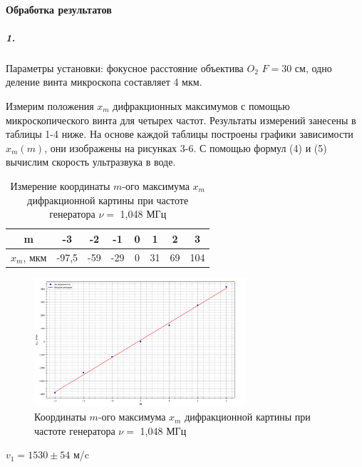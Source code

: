 \documentclass[a4paper,12pt]{article}
\begin{document}
\paragraph{Обработка результатов\\}
\subparagraph{1.} Параметры установки: фокусное расстояние объектива $  O_2  $ $ F = 30 $ см, одно деление винта микроскопа составляет 4 мкм.\par
Измерим положения $ x_m $ дифракционных максимумов с помощью микроскопического винта для четырех частот. Результаты измерений занесены в таблицы 1-4 ниже. На основе каждой таблицы построены графики зависимости $ x_m (m) $, они изображены на рисунках 3-6. С помощью формул (4) и (5) вычислим скорость ультразвука в воде.


\begin{table}[!h]
\begin{center}
\begin{tabular}{|c|c|c|c|c|c|c|c|}
\hline
     m & -3 & -2& -1 & 0 & 1 & 2 & 3 \\ \hline
     $x_m$, мкм & -97,5 & -59 & -29 & 0 & 31 & 69 & 104  \\ \hline
\end{tabular}
\end{center}
\caption{Измерение координаты $ m $-ого максимума $ x_m $ дифракционной картины при частоте генератора $ \nu = $ 1,048 МГц}
\end{table}
\begin{figure}[!h]
		\centering	
		\includegraphics[width=0.7\textwidth]{graph1.png}
		\caption{Координаты $ m $-ого максимума $ x_m $ дифракционной картины при частоте генератора $ \nu = $ 1,048 МГц}
		\label{diff}
	\end{figure}
\begin{center}
    $v_1= 1530\pm 54$ м/c
\end{center} \newpage
\end{document}

